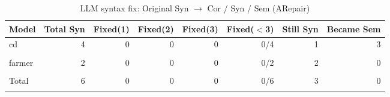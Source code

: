 \begin{table}[h]
\centering
\caption{LLM syntax fix: Original Syn $\rightarrow$ Cor / Syn / Sem (ARepair)}
\label{tab:syn_fix_arepair}
\begin{tabular}{|l|r|r|r|r|r|r|r|}
\hline
Model & Total Syn & Fixed(1) & Fixed(2) & Fixed(3) & Fixed($<$3) & Still Syn & Became Sem \\
\hline
cd & 4 & 0 & 0 & 0 & 0/4 & 1 & 3 \\\\
\hline
farmer & 2 & 0 & 0 & 0 & 0/2 & 2 & 0 \\\\
\hline
Total & 6 & 0 & 0 & 0 & 0/6 & 3 & 0 \\\\
\hline
\end{tabular}
\end{table}
